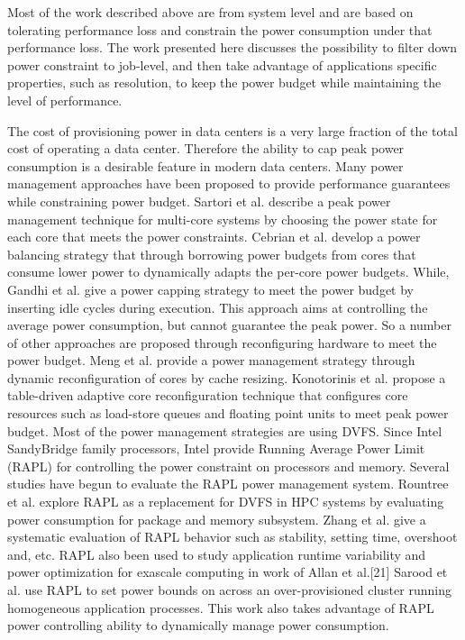 Most of the work described above are from system level and are based on tolerating performance loss and constrain the power consumption under that performance loss. The work presented here discusses the possibility to filter down power constraint to job-level, and then take advantage of applications specific properties, such as resolution, to keep the power budget while maintaining the level of performance. 





The cost of provisioning power in data centers is a very large fraction of the total cost of operating a data center.\cite{pelley2010power,hamilton2008cost} Therefore the ability to cap peak power consumption is a desirable feature in modern data centers.\cite{cochran2011pack} Many power management approaches have been proposed to provide performance guarantees while constraining power budget. Sartori et al.\cite{sartori2009distributed} describe a peak power management technique for multi-core systems by choosing the power state for each core that meets the power constraints. Cebrian et al.\cite{cebrian2011power} develop a power balancing strategy that through borrowing power budgets from cores that consume lower power to dynamically adapts the per-core power budgets. While, Gandhi et al.\cite{gandhi2009power} give a power capping strategy to meet the power budget by inserting idle cycles during execution. This approach aims at controlling the average power consumption, but cannot guarantee the peak power. So a number of other approaches are proposed through reconfiguring hardware to meet the power budget. Meng et al.\cite{meng2008multi} provide a power management strategy through dynamic reconfiguration of cores by cache resizing. Konotorinis et al.\cite{kontorinis2009reducing} propose a table-driven adaptive core reconfiguration technique that configures core resources such as load-store queues and floating point units to meet peak power budget. Most of the power management strategies are using DVFS. Since Intel SandyBridge family processors, Intel provide Running Average Power Limit (RAPL) for controlling the power constraint on processors and memory. Several studies have begun to evaluate the RAPL power management system. Rountree et al.\cite{rountree2012beyond} explore RAPL as a replacement for DVFS in HPC systems by evaluating power consumption for package and memory subsystem. Zhang et al.\cite{zhang2015quantitative} give a systematic evaluation of RAPL behavior such as stability, setting time, overshoot and, etc. RAPL also been used to study application runtime variability and power optimization for exascale computing in work of Allan et al.\cite{porterfield2015application}[21] Sarood et al.\cite{sarood2013optimizing} use RAPL to set power bounds on across an over-provisioned cluster running homogeneous application processes.  This work also takes advantage of RAPL power controlling ability to dynamically manage power consumption.



